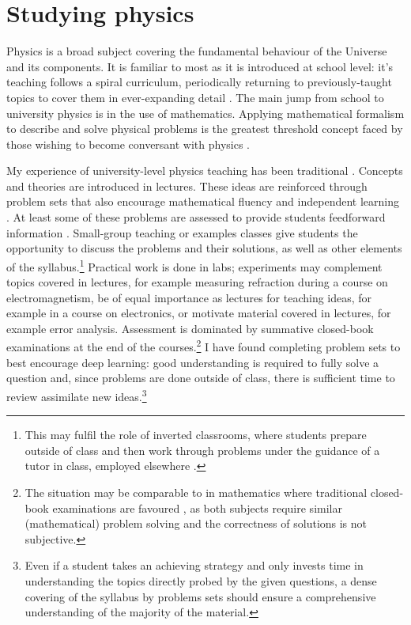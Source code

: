 \documentclass[a4paper, 11pt, twoside]{article}
\begin{document}
\section{Studying physics}\label{sec:physics}

Physics is a broad subject covering the fundamental behaviour of the Universe and its components. It is familiar to most as it is introduced at school level: it's teaching follows a spiral curriculum, periodically returning to previously-taught topics to cover them in ever-expanding detail \citep{Bruner1960}. The main jump from school to university physics is in the use of mathematics. Applying mathematical formalism to describe and solve physical problems is the greatest threshold concept \citep{Meyer2003} faced by those wishing to become conversant with physics \citep{Wigner1960}.

My experience of university-level physics teaching has been traditional \citep[cf.][]{Iannone2015}. Concepts and theories are introduced in lectures. These ideas are reinforced through problem sets that also encourage mathematical fluency and independent learning \citep{Pike2015}. At least some of these problems are assessed to provide students feedforward information \citep{Bloxham2015}. Small-group teaching or examples classes give students the opportunity to discuss the problems and their solutions, as well as other elements of the syllabus.\footnote{This may fulfil the role of inverted classrooms, where students prepare outside of class and then work through problems under the guidance of a tutor in class, employed elsewhere \citep{Lage2000}.} Practical work is done in labs; experiments may complement topics covered in lectures, for example measuring refraction during a course on electromagnetism, be of equal importance as lectures for teaching ideas, for example in a course on electronics, or motivate material covered in lectures, for example error analysis. Assessment is dominated by summative closed-book examinations at the end of the courses.\footnote{The situation may be comparable to in mathematics where traditional closed-book examinations are favoured \citep{Iannone2014}, as both subjects require similar (mathematical) problem solving and the correctness of solutions is not subjective.} I have found completing problem sets to best encourage deep learning: good understanding is required to fully solve a question and, since problems are done outside of class, there is sufficient time to review assimilate new ideas.\footnote{Even if a student takes an achieving strategy \citep[chapter 2]{Biggs1987} and only invests time in understanding the topics directly probed by the given questions, a dense covering of the syllabus by problems sets should ensure a comprehensive understanding of the majority of the material.}
\end{document}

